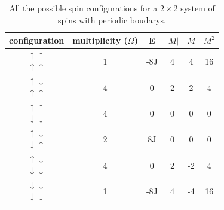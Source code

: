 \documentclass[a4paper,english, 10pt, twoside]{article}
\begin{document}
\begin{table}[H]
\centering
\begin{tabular}{|c|c|c|c|c|c|}
\hline
configuration & multiplicity ($\Omega$)& E & $|M|$ & $M$ & $M^2$\\
\hline
$\begin{matrix}\uparrow \uparrow\\ \uparrow \uparrow\end{matrix}$ & 1 & -8J & 4 & 4 & 16 \\
\hline
$\begin{matrix}\uparrow \downarrow \\ \uparrow \uparrow\end{matrix}$& 4 & 0 & 2 & 2 & 4\\
\hline
$\begin{matrix}\uparrow \uparrow \\ \downarrow \downarrow \end{matrix}$ & 4 & 0 & 0 & 0 & 0 \\
\hline
$\begin{matrix}\uparrow \downarrow  \\ \downarrow \uparrow \end{matrix}$ & 2 & 8J & 0 & 0 & 0 \\
\hline
$\begin{matrix}\uparrow \downarrow \\ \downarrow \downarrow \end{matrix}$ & 4 & 0 & 2  & -2 & 4\\
\hline
$\begin{matrix}\downarrow \downarrow  \\ \downarrow \downarrow \end{matrix}$ & 1& -8J & 4 & -4 & 16 \\

\hline
\end{tabular}
\label{table1}
\caption{All the possible spin configurations for a $2\times 2$ system of spins with periodic boudarys.}
\end{table}
\end{document}
